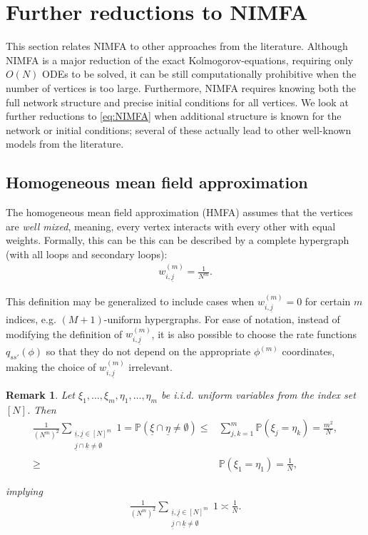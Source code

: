 \documentclass{article}
\newcommand{\ul}{\underline}
\newcommand{\pr}{\mathbb{P}}
\newcommand{\1}[1]{{\mathds{1}}_{\left\{#1\right\}}}
\newtheorem{remark}{Remark}
\newcommand{\remm}[1]{{#1}}
\begin{document}
	
	
	\section{Further reductions to NIMFA}
	\label{s:red}
	
	This section relates NIMFA to other approaches from the literature. Although NIMFA is a major reduction of the exact Kolmogorov-equations, requiring only $O(N)$ ODEs to be solved, it can be still computationally prohibitive when the number of vertices is too large. Furthermore, NIMFA requires knowing both the full network structure and precise initial conditions for all vertices. We look at further reductions to \eqref{eq:NIMFA} when additional structure is known for the network or initial conditions; several of these actually lead to other well-known models from the literature.
	
	\subsection{Homogeneous mean field approximation}
	\label{s:HMFA}
	
	The homogeneous mean field approximation (HMFA) assumes that the vertices are \emph{well mixed}, meaning, every vertex interacts with every other with equal weights. Formally, this can be this can be described by a complete hypergraph (with all loops and secondary loops):
	\begin{align*}
		w_{i,\underline{j}}^{(m)}=\frac{1}{N^m}.
	\end{align*}
	
	This definition may be generalized to include cases when $w_{i, \underline{j}}^{(m)}=0$ for certain $m$ indices, e.g. $(M+1)$-uniform hypergraphs. For ease of notation, instead of modifying the definition of $w_{i, \underline{j}}^{(m)}$, it is also possible to choose the rate functions $q_{ss'}(\phi)$ so that they do not depend on the appropriate $\phi^{(m)}$ coordinates, making the choice of $w_{i,\underline{j}}^{(m)}$ irrelevant.
	
	\remm{
	
	\begin{remark}
	\label{r:w_bar}
	Let $\xi_1, \dots, \xi_m, \eta_1, \dots, \eta_m$ be i.i.d. uniform variables from the index set $[N]$. Then 
	\begin{align*}
	\frac{1}{\left(N^m \right)^2} \sum_{\substack{\ul{i}, \ul{j} \in [N]^m \\ \ul{j} \cap \ul{k} \neq \emptyset}} 1=\pr \left( \ul{\xi} \cap \ul{\eta} \neq \emptyset \right) \leq & \sum_{j,k=1}^{m} \pr \left(\xi_{j} =\eta_{k} \right)=\frac{m^2}{N}, \\
	\geq & \pr \left(\xi_{1}=\eta_{1} \right)=\frac{1}{N},
	\end{align*}
	
implying
\begin{align*}
	\frac{1}{\left(N^m \right)^2} \sum_{\substack{\ul{i}, \ul{j} \in [N]^m \\ \ul{j} \cap \ul{k} \neq \emptyset}} 1 \asymp \frac{1}{N} .
\end{align*}
	\end{remark}
	}
	
\end{document}
